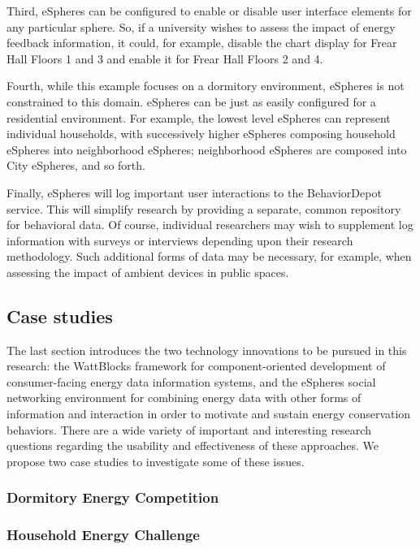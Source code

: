 Third, eSpheres can be configured to enable or disable user interface
elements for any particular sphere.  So, if a university wishes to assess
the impact of energy feedback information, it could, for example, disable
the chart display for Frear Hall Floors 1 and 3 and enable it for Frear
Hall Floors 2 and 4.

Fourth, while this example focuses on a dormitory environment, eSpheres is
not constrained to this domain.  eSpheres can be just as easily configured for a 
residential environment.  For example, the lowest level eSpheres can
represent individual households, with successively higher eSpheres
composing household eSpheres into neighborhood eSpheres; neighborhood
eSpheres are composed into City eSpheres, and so forth.  

Finally, eSpheres will log important user interactions to the BehaviorDepot
service.  This will simplify research by providing a separate, common
repository for behavioral data.  Of course, individual researchers may wish
to supplement log information with surveys or interviews depending upon
their research methodology.  Such additional forms of data may be
necessary, for example, when assessing the impact of ambient devices in
public spaces.

\subsection{Case studies}

The last section introduces the two technology innovations to be pursued in
this research: the WattBlocks framework for component-oriented development
of consumer-facing energy data information systems, and the eSpheres social
networking environment for combining energy data with other forms of
information and interaction in order to motivate and sustain energy
conservation behaviors.  There are a wide variety of important and
interesting research questions regarding the usability and effectiveness of
these approaches.  We propose two case studies to investigate some of these
issues.

\subsubsection{Dormitory Energy Competition}






\subsubsection{Household Energy Challenge}

